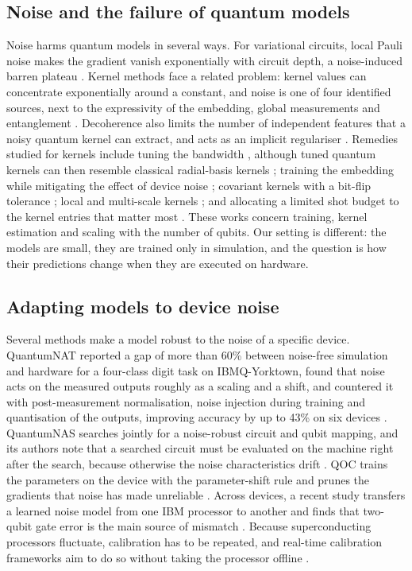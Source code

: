 \subsection{Noise and the failure of quantum models}
Noise harms quantum models in several ways. For variational circuits, local Pauli noise makes
the gradient vanish exponentially with circuit depth, a noise-induced barren plateau
\cite{wang2021nibp}. Kernel methods face a related problem: kernel values can concentrate
exponentially around a constant, and noise is one of four identified sources, next to the
expressivity of the embedding, global measurements and entanglement
\cite{thanasilp2024concentration}. Decoherence also limits the number of independent features
that a noisy quantum kernel can extract, and acts as an implicit regulariser
\cite{heyraud2022noisykernels}. Remedies studied for kernels include tuning the bandwidth
\cite{shaydulin2022bandwidth}, although tuned quantum kernels can then resemble classical
radial-basis kernels \cite{bandwidth2025similarity}; training the embedding while mitigating
the effect of device noise \cite{hubregtsen2022embedding}; covariant kernels with a bit-flip
tolerance \cite{covariant2025concentration}; local and multi-scale kernels
\cite{localkernels2026}; and allocating a limited shot budget to the kernel entries that matter
most \cite{aqka2026}. These works concern training, kernel estimation and scaling with the
number of qubits. Our setting is different: the models are small, they are trained only in
simulation, and the question is how their predictions change when they are executed on hardware.

\subsection{Adapting models to device noise}
Several methods make a model robust to the noise of a specific device. QuantumNAT reported a gap
of more than 60\% between noise-free simulation and hardware for a four-class digit task on
IBMQ-Yorktown, found that noise acts on the measured outputs roughly as a scaling and a shift,
and countered it with post-measurement normalisation, noise injection during training and
quantisation of the outputs, improving accuracy by up to 43\% on six devices
\cite{wang2022quantumnat}. QuantumNAS searches jointly for a noise-robust circuit and qubit
mapping, and its authors note that a searched circuit must be evaluated on the machine right
after the search, because otherwise the noise characteristics drift \cite{wang2022quantumnas}.
QOC trains the parameters on the device with the parameter-shift rule and prunes the gradients
that noise has made unreliable \cite{wang2022qoc}. Across devices, a recent study transfers a
learned noise model from one IBM processor to another and finds that two-qubit gate error is
the main source of mismatch \cite{farib2026crossdevice}. Because superconducting processors
fluctuate, calibration has to be repeated, and real-time calibration frameworks aim to do so
without taking the processor offline \cite{realtimecal2023}.

